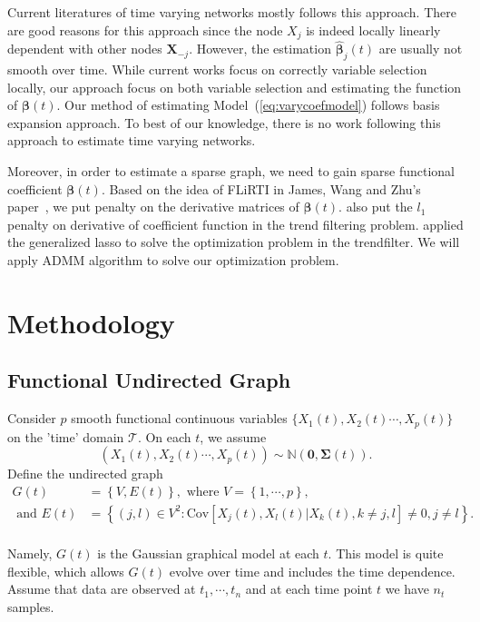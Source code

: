 \documentclass[11pt]{article}
\newcommand{\N}{\mathbb N}
\newcommand{\bX}{\mathbf X}
\newcommand{\bbeta}{{\boldsymbol{\beta}}}
\newcommand{\bSigma}{{\boldsymbol{\Sigma}}}
\begin{document}
Current literatures of time varying networks mostly follows this approach. There are good reasons for this approach since the node $X_j$ is indeed locally linearly dependent with other nodes $\bX_{-j}$. However, the estimation $\hat{\bbeta}_j(t)$ are usually not smooth over time. While current works focus on correctly variable selection locally, our approach focus on both variable selection and estimating the function of $\bbeta(t)$. Our method of estimating Model~(\ref{eq:varycoefmodel}) follows basis expansion approach. To best of our knowledge, there is no work following this approach to estimate time varying networks.

Moreover, in order to estimate a sparse graph, we need to gain sparse functional coefficient $\bbeta(t)$. Based on the idea of FLiRTI in James, Wang and Zhu's paper~\cite{james2009functional}, we put penalty on the derivative matrices of $\bbeta(t)$. \cite{kim2009ell_1} also put the $l_1$ penalty on derivative of coefficient function in the trend filtering problem. \cite{tibshirani2014adaptive} applied the generalized lasso \citep{tibshirani2011solution} to solve the optimization problem in the trendfilter. We will apply ADMM algorithm to solve our optimization problem. 


\section{Methodology}

\subsection{Functional Undirected Graph}
Consider $p$ smooth functional continuous variables $\{ X_1(t), X_2(t) \cdots, X_p(t)\}$ on the 'time' domain $\mathcal{T}$. On each $t$, we assume
$$ (X_1(t), X_2(t) \cdots, X_p(t)) \sim \N(\mathbf{0}, \bSigma(t)). $$ 
Define the undirected graph 
\begin{equation}
	\label{eq:funcgraph}
	\begin{aligned}
	G(t) &= \left\{ V, E(t) \right\},\text{ where } V = \left\{1,\cdots, p\right\},\\
	\text{ and } E(t) &= \left\{ (j,l) \in V^2 : \text{Cov} \left[ X_j(t), X_l(t)| X_k(t), k \neq j,l \right] \neq 0, j \neq l \right\}.\\
	\end{aligned}
\end{equation}

Namely, $G(t)$ is the Gaussian graphical model at each $t$. This model is quite flexible, which allows $G(t)$ evolve over time and includes the time dependence. Assume that data are observed at $t_1, \cdots, t_n$ and at each time point $t$ we have $n_{t}$ samples.
\end{document}
